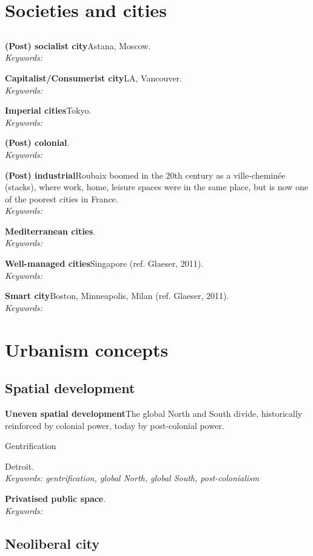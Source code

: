 \documentclass{article}
\newcommand{\entry}[3]{\textbf{#1}\quad #2. \\\textit{Keywords: #3}}
\begin{document}
\section{Societies and cities}

\subsection{}

\entry{(Post) socialist city}{Astana, Moscow}{}

\entry{Capitalist/Consumerist city}{LA, Vancouver}{}

\entry{Imperial cities}{Tokyo}{}

\entry{(Post) colonial}{}{}

\entry{(Post) industrial}{Roubaix boomed in the 20th century as a ville-cheminée (stacks), where work, home, leisure spaces were in the same place, but is now one of the poorest cities in France}{}

\entry{Mediterranean cities}{}{}

\entry{Well-managed cities}{Singapore (ref. Glaeser, 2011)}{}

\entry{Smart city}{Boston, Minneapolis, Milan (ref. Glaeser, 2011)}{}

\section{Urbanism concepts}

\subsection{Spatial development}

\entry{Uneven spatial development}{The global North and South divide, historically reinforced by colonial power, today by post-colonial power.

Gentrification

Detroit}{gentrification, global North, global South, post-colonialism}

\entry{Privatised public space}{}{}

\subsection{Neoliberal city}
\end{document}
